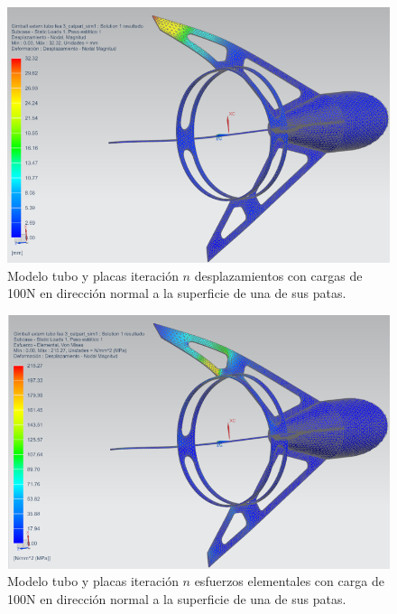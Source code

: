 \begin{figure}[htb]
    \centering
    \includegraphics[width=\linewidth]{fig/fea/patas3.png}
    \caption{Modelo tubo y placas iteración $n$ desplazamientos con cargas de 100N en dirección normal a la superficie de una de sus patas.}
    \label{fig:fea/patas3}
\end{figure}


\begin{figure}[htb]
    \centering
    \includegraphics[width=\linewidth]{fig/fea/patas4.png}
    \caption{Modelo tubo y placas iteración $n$ esfuerzos elementales con carga de 100N en dirección normal a la superficie de una de sus patas.}
    \label{fig:fea/patas4}
\end{figure}

